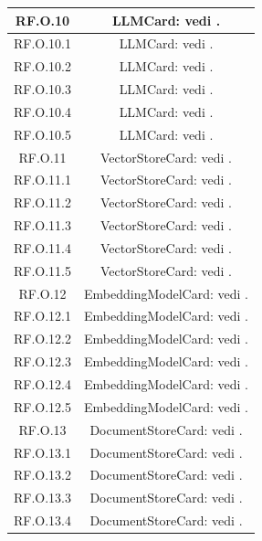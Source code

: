 \documentclass[10pt, a4paper]{article}
\begin{document}
\begin{xltabular}{\textwidth}{c|c}
\hline 
RF.O.10  & LLMCard: vedi .\\
\hline 
RF.O.10.1  & LLMCard: vedi .\\
\hline
RF.O.10.2  & LLMCard: vedi .\\
\hline 
RF.O.10.3  & LLMCard: vedi .\\
\hline 
RF.O.10.4  & LLMCard: vedi .\\
\hline 
RF.O.10.5  & LLMCard: vedi .\\
\hline
RF.O.11 &  VectorStoreCard: vedi .\\ 
\hline
RF.O.11.1 &  VectorStoreCard: vedi .\\ 
\hline
RF.O.11.2 &  VectorStoreCard: vedi .\\ 
\hline
RF.O.11.3 &  VectorStoreCard: vedi .\\ 
\hline
RF.O.11.4 &  VectorStoreCard: vedi .\\ 
\hline
RF.O.11.5 &  VectorStoreCard: vedi .\\ 
\hline
RF.O.12 &  EmbeddingModelCard: vedi . \\
\hline
RF.O.12.1 &  EmbeddingModelCard: vedi . \\
\hline
RF.O.12.2 &  EmbeddingModelCard: vedi . \\
\hline
RF.O.12.3 &  EmbeddingModelCard: vedi . \\
\hline
RF.O.12.4 &  EmbeddingModelCard: vedi . \\
\hline
RF.O.12.5 &  EmbeddingModelCard: vedi . \\
\hline
RF.O.13 & DocumentStoreCard: vedi . \\ 
\hline
RF.O.13.1 & DocumentStoreCard: vedi . \\ 
\hline
RF.O.13.2 & DocumentStoreCard: vedi . \\ 
\hline
RF.O.13.3 & DocumentStoreCard: vedi . \\ 
\hline
RF.O.13.4 & DocumentStoreCard: vedi . \\ 

\end{xltabular}
\end{document}
